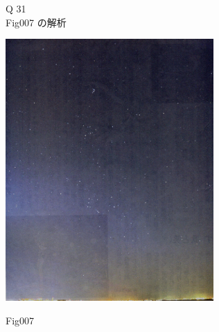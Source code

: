 \documentclass{jarticle}
\begin{document}
\vspace{1cm}

Q 31 \\
Fig007 の解析\\




\begin{minipage}{8cm}

\includegraphics[height=10cm, angle=0]{fig007c.jpg}
\begin{center}
Fig007
\end{center}
\end{minipage}
\end{document}
